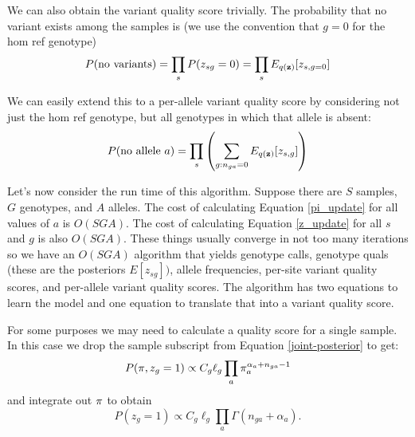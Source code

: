 \documentclass[nofootinbib,amssymb,amsmath]{revtex4}
\newcommand{\vz}{{\bf z}}
\newcommand{\vpi}{{\bf \pi}}
\begin{document}
We can also obtain the variant quality score trivially.  The probability that no variant exists among the samples is (we use the convention that $g=0$ for the hom ref genotype)
\begin{equation}
P({\rm no~variants}) = \prod_s P(z_{sg} = 0) = \prod_s E_{q(\vz)}[z_{s, g=0}] 
\end{equation}

We can easily extend this to a per-allele variant quality score by considering not just the hom ref genotype, but all genotypes in which that allele is absent:
\begin{equation}
P({\rm no~allele}~a) = \prod_s \left( \sum_{g : n_{ga} = 0} E_{q(\vz)}[z_{s, g}] \right)
\end{equation}

Let's now consider the run time of this algorithm.  Suppose there are $S$ samples, $G$ genotypes, and $A$ alleles.  The cost of calculating Equation \ref{pi_update} for all values of $a$ is $O(S G A)$.  The cost of calculating Equation \ref{z_update} for all $s$ and $g$ is also $O(S G A)$.  These things usually converge in not too many iterations so we have an $O(S G A)$ algorithm that yields genotype calls, genotype quals (these are the posteriors $E[z_{sg}])$, allele frequencies, per-site variant quality scores, and per-allele variant quality scores.  The algorithm has two equations to learn the model and one equation to translate that into a variant quality score.

For some purposes we may need to calculate a quality score for a single sample.  In this case we drop the sample subscript from Equation \ref{joint-posterior} to get:
\begin{equation}
P(\vpi, z_g = 1) \propto C_g \ell_g \prod_a \pi_a^{\alpha_a + n_{ga} - 1} 
\end{equation}
and integrate out $\vpi$ to obtain
\begin{equation}
P(z_g = 1) \propto C_g \ell_g \prod_a \Gamma(n_{ga} + \alpha_a).
\end{equation}
\end{document}

